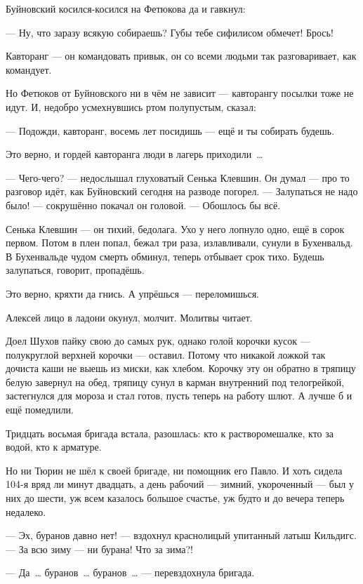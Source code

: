 Буйновский косился-косился на Фетюкова да и гавкнул:

--- Ну, что заразу всякую собираешь? Губы тебе сифилисом обмечет! Брось!

Кавторанг --- он командовать привык, он со всеми людьми так разговаривает, как командует.

Но Фетюков от Буйновского ни в чём не зависит --- кавторангу посылки тоже не идут. И, недобро усмехнувшись ртом полупустым, сказал:

--- Подожди, кавторанг, восемь лет посидишь --- ещё и ты собирать будешь.

Это верно, и гордей кавторанга люди в лагерь приходили~\dots{}

--- Чего-чего? --- недослышал глуховатый Сенька Клевшин. Он думал --- про то разговор идёт, как Буйновский сегодня на разводе погорел. --- Залупаться не надо было! --- сокрушённо покачал он головой. --- Обошлось бы всё.

Сенька Клевшин --- он тихий, бедолага. Ухо у него лопнуло одно, ещё в сорок первом. Потом в плен попал, бежал три раза, излавливали, сунули в Бухенвальд. В Бухенвальде чудом смерть обминул, теперь отбывает срок тихо. Будешь залупаться, говорит, пропадёшь.

Это верно, кряхти да гнись. А упрёшься --- переломишься.

Алексей лицо в ладони окунул, молчит. Молитвы читает.

Доел Шухов пайку свою до самых рук, однако голой корочки кусок --- полукруглой верхней корочки --- оставил. Потому что никакой ложкой так дочиста каши не выешь из миски, как хлебом. Корочку эту он обратно в тряпицу белую завернул на обед, тряпицу сунул в карман внутренний под телогрейкой, застегнулся для мороза и стал готов, пусть теперь на работу шлют. А лучше б и ещё помедлили.

Тридцать восьмая бригада встала, разошлась: кто к растворомешалке, кто за водой, кто к арматуре.

Но ни Тюрин не шёл к своей бригаде, ни помощник его Павло. И хоть сидела 104-я вряд ли минут двадцать, а день рабочий --- зимний, укороченный --- был у них до шести, уж всем казалось большое счастье, уж будто и до вечера теперь недалеко.

--- Эх, буранов давно нет! --- вздохнул краснолицый упитанный латыш Кильдигс. --- За всю зиму --- ни бурана! Что за зима?!

--- Да~\dots{} буранов~\dots{} буранов~\dots{} --- перевздохнула бригада.

